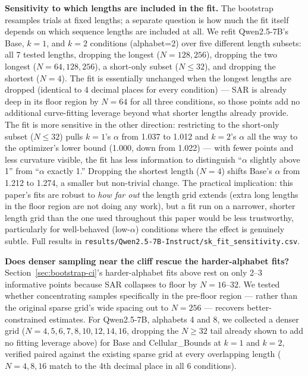 \documentclass[11pt]{article}
\begin{document}
\textbf{Sensitivity to which lengths are included in the fit.} The bootstrap resamples trials at fixed lengths; a separate question is how much the fit itself depends on which sequence lengths are included at all. We refit Qwen2.5-7B's Base, $k=1$, and $k=2$ conditions (alphabet=2) over five different length subsets: all 7 tested lengths, dropping the longest ($N=128, 256$), dropping the two longest ($N=64, 128, 256$), a short-only subset ($N\leq32$), and dropping the shortest ($N=4$). The fit is essentially unchanged when the longest lengths are dropped (identical to 4 decimal places for every condition) --- SAR is already deep in its floor region by $N=64$ for all three conditions, so those points add no additional curve-fitting leverage beyond what shorter lengths already provide. The fit is more sensitive in the other direction: restricting to the short-only subset ($N\leq32$) pulls $k=1$'s $\alpha$ from 1.037 to 1.012 and $k=2$'s $\alpha$ all the way to the optimizer's lower bound (1.000, down from 1.022) --- with fewer points and less curvature visible, the fit has less information to distinguish ``$\alpha$ slightly above 1'' from ``$\alpha$ exactly 1.'' Dropping the shortest length ($N=4$) shifts Base's $\alpha$ from 1.212 to 1.274, a smaller but non-trivial change. The practical implication: this paper's fits are robust to \emph{how far out} the length grid extends (extra long lengths in the floor region are not doing any work), but a fit run on a narrower, shorter length grid than the one used throughout this paper would be less trustworthy, particularly for well-behaved (low-$\alpha$) conditions where the effect is genuinely subtle. Full results in \texttt{results/Qwen2.5-7B-Instruct/sk\_fit\_sensitivity.csv}.

\textbf{Does denser sampling near the cliff rescue the harder-alphabet fits?} Section~\ref{sec:bootstrap-ci}'s harder-alphabet fits above rest on only 2--3 informative points because SAR collapses to floor by $N=16$--$32$. We tested whether concentrating samples specifically in the pre-floor region --- rather than the original sparse grid's wide spacing out to $N=256$ --- recovers better-constrained estimates. For Qwen2.5-7B, alphabets 4 and 8, we collected a denser grid ($N=4,5,6,7,8,10,12,14,16$, dropping the $N\geq32$ tail already shown to add no fitting leverage above) for Base and Cellular\_Bounds at $k=1$ and $k=2$, verified paired against the existing sparse grid at every overlapping length ($N=4,8,16$ match to the 4th decimal place in all 6 conditions).
\end{document}
